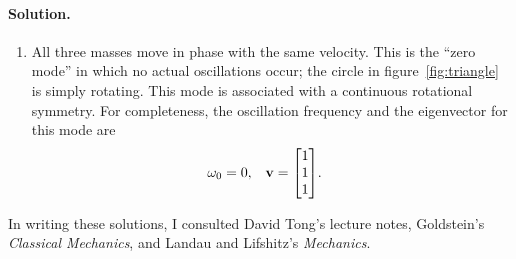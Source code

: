 \documentclass[11pt]{article}
\newenvironment{solution}
{
    \paragraph{Solution.}
    \ignorespaces
}
{
    \bigskip
}
\begin{document}
\begin{solution}
\begin{enumerate}
		\item All three masses move in phase with the same velocity.  This is the ``zero mode'' in which no actual oscillations occur; the circle in figure~\ref{fig:triangle} is simply rotating.  This mode is associated with a continuous rotational symmetry.  For completeness, the oscillation frequency and the eigenvector for this mode are
			\begin{align}
				\omo &= 0, & \vv &= \mqty[1 \\ 1 \\ 1].
			\end{align}
	\end{enumerate}
\end{solution}

In writing these solutions, I consulted David Tong's lecture notes, Goldstein's \emph{Classical Mechanics}, and Landau and Lifshitz's \emph{Mechanics}.
\end{document}
